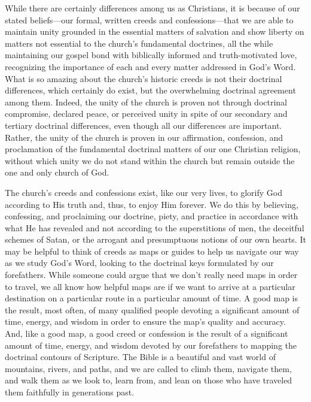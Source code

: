 \medskip

While there are certainly differences among us as Christians, it is because of our stated beliefs—our formal, written creeds and confessions—that we are able to maintain unity grounded in the essential matters of salvation and show liberty on matters not essential to the church’s fundamental doctrines, all the while maintaining our gospel bond with biblically informed and truth-motivated love, recognizing the importance of each and every matter addressed in God’s Word. What is so amazing about the church’s historic creeds is not their doctrinal differences, which certainly do exist, but the overwhelming doctrinal agreement among them. Indeed, the unity of the church is proven not through doctrinal compromise, declared peace, or perceived unity in spite of our secondary and tertiary doctrinal differences, even though all our differences are important. Rather, the unity of the church is proven in our affirmation, confession, and proclamation of the fundamental doctrinal matters of our one Christian religion, without which unity we do not stand within the church but remain outside the one and only church of God.

\medskip

The church’s creeds and confessions exist, like our very lives, to glorify God according to His truth and, thus, to enjoy Him forever. We do this by believing, confessing, and proclaiming our doctrine, piety, and practice in accordance with what He has revealed and not according to the superstitions of men, the deceitful schemes of Satan, or the arrogant and presumptuous notions of our own hearts. It may be helpful to think of creeds as maps or guides to help us navigate our way as we study God’s Word, looking to the doctrinal keys formulated by our forefathers. While someone could argue that we don’t really need maps in order to travel, we all know how helpful maps are if we want to arrive at a particular destination on a particular route in a particular amount of time. A good map is the result, most often, of many qualified people devoting a significant amount of time, energy, and wisdom in order to ensure the map’s quality and accuracy. And, like a good map, a good creed or confession is the result of a significant amount of time, energy, and wisdom devoted by our forefathers to mapping the doctrinal contours of Scripture. The Bible is a beautiful and vast world of mountains, rivers, and paths, and we are called to climb them, navigate them, and walk them as we look to, learn from, and lean on those who have traveled them faithfully in generations past.

